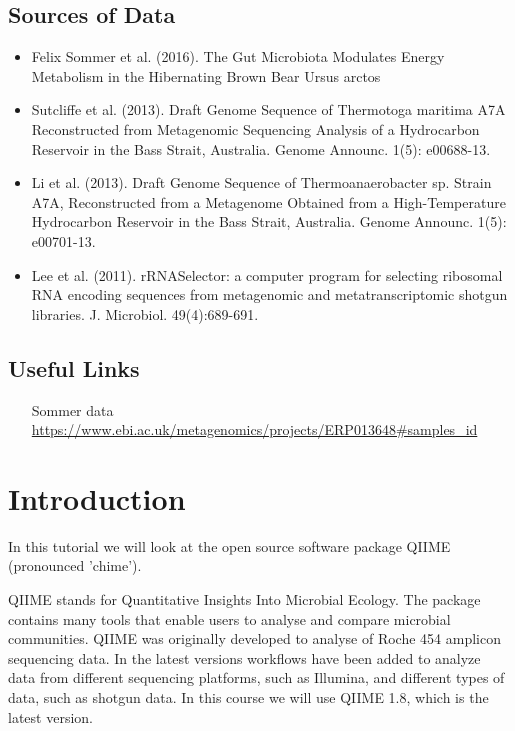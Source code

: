 \subsection{Sources of Data}
\begin{itemize}
  \item Felix Sommer et al. (2016). The Gut Microbiota Modulates Energy Metabolism in the Hibernating Brown Bear Ursus arctos
  \item Sutcliffe et al. (2013). Draft Genome Sequence of Thermotoga maritima A7A Reconstructed from Metagenomic Sequencing Analysis of a Hydrocarbon Reservoir in the Bass Strait, Australia. Genome Announc. 1(5): e00688-13.
  \item Li et al. (2013). Draft Genome Sequence of Thermoanaerobacter sp. Strain A7A, Reconstructed from a Metagenome Obtained from a High-Temperature Hydrocarbon Reservoir in the Bass Strait, Australia. Genome Announc. 1(5): e00701-13.
  \item Lee et al. (2011). rRNASelector: a computer program for selecting ribosomal RNA encoding sequences from metagenomic and metatranscriptomic shotgun libraries. J. Microbiol. 49(4):689-691.
\end{itemize}

\subsection{Useful Links}
 
\begin{itemize}
  \hfill\\
    \url{http://en.wikipedia.org/wiki/FASTQ_format#Encoding}
  \item [Sommer data ]\hfill\\
    \url{https://www.ebi.ac.uk/metagenomics/projects/ERP013648#samples_id}
\end{itemize}

\newpage


\section{Introduction}

\begin{note}
In this tutorial we will look at the open source software package QIIME (pronounced 'chime').
\end{note}

QIIME stands for Quantitative Insights Into Microbial Ecology. The package contains many tools that enable users to analyse and compare microbial communities. QIIME was originally developed to analyse of Roche 454 amplicon sequencing data. In the latest versions workflows have been added to analyze data from different sequencing platforms, such as Illumina, and different types of data, such as shotgun data. In this course we will use QIIME 1.8, which is the latest version.

